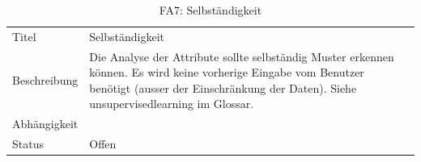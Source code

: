 \begin{table}[H] 
	\caption{FA7: Selbständigkeit}
	\centering
	\label{fig:anforderungsanalyse:funktionaleanforderung:fa7}
	\begin{tabular}{ | l | L{10cm} | } 
		\hline 
		 \\ \hline 
		Titel & Selbständigkeit \\ \hline 
		Beschreibung & Die Analyse der Attribute sollte selbständig Muster erkennen können. Es wird keine vorherige Eingabe vom Benutzer benötigt (ausser der Einschränkung der Daten). Siehe \gls{unsupervisedlearning} im Glossar. \\ \hline 
		Abhängigkeit & \\ \hline 
		Status & Offen \\ \hline 
	\end{tabular}
\end{table}

